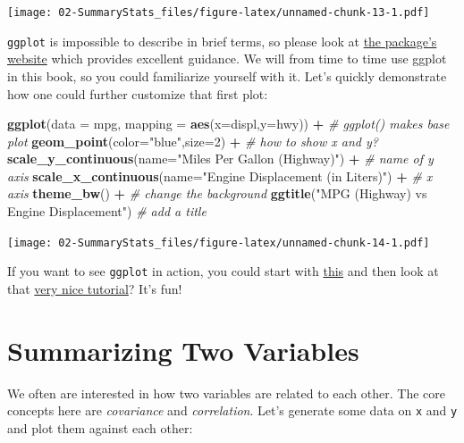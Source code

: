 \documentclass[]{book}
\newenvironment{Shaded}{\begin{snugshade}}{\end{snugshade}}
\newcommand{\KeywordTok}[1]{\textcolor[rgb]{0.13,0.29,0.53}{\textbf{#1}}}
\newcommand{\DataTypeTok}[1]{\textcolor[rgb]{0.13,0.29,0.53}{#1}}
\newcommand{\DecValTok}[1]{\textcolor[rgb]{0.00,0.00,0.81}{#1}}
\newcommand{\StringTok}[1]{\textcolor[rgb]{0.31,0.60,0.02}{#1}}
\newcommand{\CommentTok}[1]{\textcolor[rgb]{0.56,0.35,0.01}{\textit{#1}}}
\newcommand{\OperatorTok}[1]{\textcolor[rgb]{0.81,0.36,0.00}{\textbf{#1}}}
\newcommand{\NormalTok}[1]{#1}
\begin{document}
\texttt{[image: 02-SummaryStats\_files/figure-latex/unnamed-chunk-13-1.pdf]}

\texttt{ggplot} is impossible to describe in brief terms, so please look
at \href{http://ggplot2.tidyverse.org}{the package's website} which
provides excellent guidance. We will from time to time use ggplot in
this book, so you could familiarize yourself with it. Let's quickly
demonstrate how one could further customize that first plot:

\begin{Shaded}
\begin{Highlighting}[]
\KeywordTok{ggplot}\NormalTok{(}\DataTypeTok{data =}\NormalTok{ mpg, }\DataTypeTok{mapping =} \KeywordTok{aes}\NormalTok{(}\DataTypeTok{x=}\NormalTok{displ,}\DataTypeTok{y=}\NormalTok{hwy)) }\OperatorTok{+}\StringTok{   }\CommentTok{# ggplot() makes base plot}
\StringTok{  }\KeywordTok{geom_point}\NormalTok{(}\DataTypeTok{color=}\StringTok{"blue"}\NormalTok{,}\DataTypeTok{size=}\DecValTok{2}\NormalTok{) }\OperatorTok{+}\StringTok{     }\CommentTok{# how to show x and y?}
\StringTok{  }\KeywordTok{scale_y_continuous}\NormalTok{(}\DataTypeTok{name=}\StringTok{"Miles Per Gallon (Highway)"}\NormalTok{) }\OperatorTok{+}\StringTok{  }\CommentTok{# name of y axis}
\StringTok{  }\KeywordTok{scale_x_continuous}\NormalTok{(}\DataTypeTok{name=}\StringTok{"Engine Displacement (in Liters)"}\NormalTok{) }\OperatorTok{+}\StringTok{ }\CommentTok{# x axis}
\StringTok{  }\KeywordTok{theme_bw}\NormalTok{() }\OperatorTok{+}\StringTok{    }\CommentTok{# change the background}
\StringTok{  }\KeywordTok{ggtitle}\NormalTok{(}\StringTok{"MPG (Highway) vs Engine Displacement"}\NormalTok{)   }\CommentTok{# add a title}
\end{Highlighting}
\end{Shaded}

\texttt{[image: 02-SummaryStats\_files/figure-latex/unnamed-chunk-14-1.pdf]}

If you want to see \texttt{ggplot} in action, you could start with
\href{http://jcyhong.github.io/ggplot_demo.html}{this} and then look at
that
\href{https://tutorials.iq.harvard.edu/R/Rgraphics/Rgraphics.html}{very
nice tutorial}? It's fun!

\section{Summarizing Two Variables}\label{summarize-two}

We often are interested in how two variables are related to each other.
The core concepts here are \emph{covariance} and \emph{correlation}.
Let's generate some data on \texttt{x} and \texttt{y} and plot them
against each other:
\end{document}
